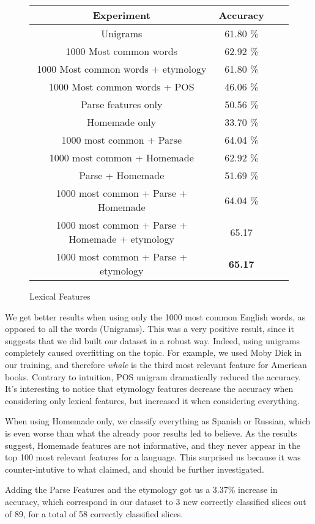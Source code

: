 \documentclass[10pt]{article}
\begin{document}
\begin{figure}[h]
\centering\begin{tabular}{|c|c|c|c|}
\hline 
Experiment & Accuracy \\
\hline 
Unigrams & 61.80 \% \\
1000 Most common words & 62.92 \%  \\
1000 Most common words + etymology & 61.80 \%  \\
1000 Most common words + POS & 46.06 \%  \\
\hline
Parse features only & 50.56 \%\\
\hline
Homemade only & 33.70 \%\\
\hline
1000 most common + Parse & 64.04 \%\\
1000 most common + Homemade & 62.92 \%\\
Parse + Homemade & 51.69 \%\\
\hline
1000 most common + Parse + Homemade & 64.04 \% \\
1000 most common + Parse + Homemade + etymology & 65.17 \\
1000 most common + Parse + etymology & \textbf{65.17} \\
\hline
\end{tabular}
\caption{Lexical Features}
\end{figure}
We get better results when using only the 1000 most common English words, as opposed to all the words (Unigrams). This was a very positive result, since it suggests that we did built our dataset in a robust way. Indeed, using unigrams completely caused overfitting on the topic. For example, we used Moby Dick in our training, and therefore \emph{whale} is the third most relevant feature for American books. Contrary to intuition, POS unigram dramatically reduced the accuracy. It's interesting to notice that etymology features decrease the accuracy when considering only lexical features, but increased it when considering everything.


When using Homemade only, we classify everything as Spanish or Russian, which is even worse than what the already poor results led to believe. As the results suggest, Homemade features are not informative, and they never appear in the top 100 most relevant features for a language. This surprised us because it was counter-intutive to what \cite{homemade} claimed, and should be further investigated.


Adding the Parse Features and the etymology got us a 3.37\% increase in accuracy, which correspond in our dataset to 3 new correctly classified slices out of 89, for a total of 58 correctly classified slices.
\end{document}
